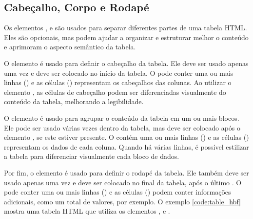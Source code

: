 \subsection{Cabeçalho, Corpo e Rodapé}

Os elementos ,  e  são usados para separar diferentes partes de uma tabela HTML. Eles são opcionais, mas podem ajudar a organizar e estruturar melhor o conteúdo e aprimoram o aspecto semântico da tabela.

O elemento  é usado para definir o cabeçalho da tabela. Ele deve ser usado apenas uma vez e deve ser colocado no início da tabela. O  pode conter uma ou mais linhas () e as células () representam os cabeçalhos das colunas. Ao utilizar o elemento , as células de cabeçalho podem ser diferenciadas visualmente do conteúdo da tabela, melhorando a legibilidade.

O elemento  é usado para agrupar o conteúdo da tabela em um ou mais blocos. Ele pode ser usado várias vezes dentro da tabela, mas deve ser colocado após o elemento , se este estiver presente. O  contém uma ou mais linhas () e as células () representam os dados de cada coluna. Quando há várias linhas, é possível estilizar a tabela para diferenciar visualmente cada bloco de dados.

Por fim, o elemento  é usado para definir o rodapé da tabela. Ele também deve ser usado apenas uma vez e deve ser colocado no final da tabela, após o último . O  pode conter uma ou mais linhas () e as células () podem conter informações adicionais, como um total de valores, por exemplo. O exemplo \ref{code:table_hbf} mostra uma tabela HTML que utiliza os elementos ,  e .


